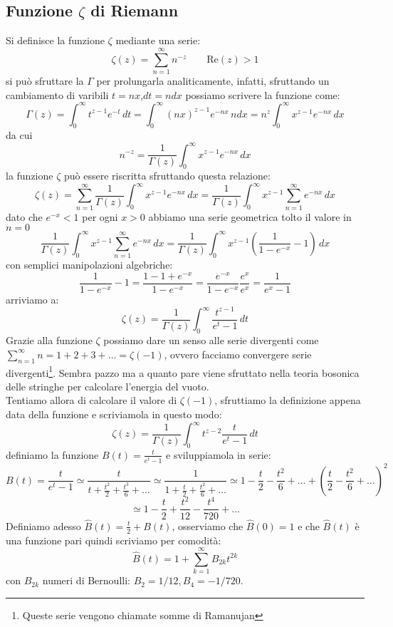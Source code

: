 \subsection{Funzione $\zeta$ di Riemann}
Si definisce la funzione $\zeta$ mediante una serie:
\[\zeta(z) = \sum_{n=1}^\infty n^{-z} \qquad \text{Re}(z)>1\]
si può sfruttare la $\Gamma$ per prolungarla analiticamente, infatti, sfruttando un cambiamento di varibili $t = nx$,$dt=ndx$ possiamo scrivere la funzione come:
\[\Gamma(z) = \int_0^\infty t^{z-1}e^{-t}\, dt =\int_0^\infty (nx)^{z-1}e^{-nx}\,n dx = n^z\int_0^\infty x^{z-1}e^{-nx}\,dx\]
da cui
\[n^{-z} =\frac{1}{\Gamma(z)} \int_0^\infty x^{z-1}e^{-nx}\,dx\]
la funzione $\zeta$ può essere riscritta sfruttando questa relazione:
\[\zeta(z) = \sum_{n=1}^\infty \frac{1}{\Gamma(z)} \int_0^\infty x^{z-1}e^{-nx}\,dx = \frac{1}{\Gamma(z)} \int_0^\infty x^{z-1} \sum_{n=1}^\infty e^{-nx}\,dx\]
dato che $e^{-x}<1$ per ogni $x>0$ abbiamo una serie geometrica tolto il valore in $n=0$
\[\frac{1}{\Gamma(z)} \int_0^\infty x^{z-1} \sum_{n=1}^\infty e^{-nx}\,dx  = \frac{1}{\Gamma(z)} \int_0^\infty x^{z-1} \left(\frac{1}{1-e^{-x}}-1\right)\,dx \]
con semplici manipolazioni algebriche:
\[\frac{1}{1-e^{-x}}-1 = \frac{1-1+e^{-x}}{1-e^{-x}} = \frac{e^{-x}}{1-e^{-x}} \frac{e^x}{e^x} = \frac{1}{e^x-1}\]
arriviamo a:
\[\zeta(z) = \frac{1}{\Gamma(z)}\int_0^\infty \frac{t^{z-1}}{e^t-1}\,dt\]
Grazie alla funzione $\zeta$ possiamo dare un senso alle serie divergenti come $\sum_{n=1}^\infty n = 1+2+3+\dots = \zeta(-1)$, ovvero facciamo convergere serie divergenti\footnote{Queste serie vengono chiamate somme di Ramanujan}. Sembra pazzo ma a quanto pare viene sfruttato nella teoria bosonica delle stringhe per calcolare l'energia del vuoto.\\
Tentiamo allora di calcolare il valore di $\zeta(-1)$, sfruttiamo la definizione appena data della funzione e scriviamola in questo modo:
\[\zeta(z) = \frac{1}{\Gamma(z)}\int_0^\infty t^{z-2} \frac{t}{e^t-1}\,dt\]
definiamo la funzione $B(t) = \frac{t}{e^t-1}$ e sviluppiamola in serie:
\[B(t) = \frac{t}{e^t-1} \simeq \frac{t}{t+\frac{t^2}{2}+\frac{t^3}{6}+\dots} \simeq \frac{1}{1+\frac{t}{2}+\frac{t^2}{6}+\dots} \simeq 1-\frac{t}{2}-\frac{t^2}{6}+ \dots + \left(\frac{t}{2}-\frac{t^2}{6}+ \dots\right)^2 \]
\[\simeq 1-\frac{t}{2}+\frac{t^2}{12}-\frac{t^4}{720}+\dots\]
Definiamo adesso $\hat{B}(t) = \frac{t}{2} + B(t)$, osserviamo che $\hat{B}(0) = 1$ e che $\hat{B}(t)$ è una funzione pari quindi scriviamo per comodità:
\[\hat{B}(t) = 1+ \sum_{k=1}^\infty B_{2k}t^{2k}\]
con $B_{2k}$ numeri di Bernoulli: $B_2 =1/12,B_4 = -1/720$.
